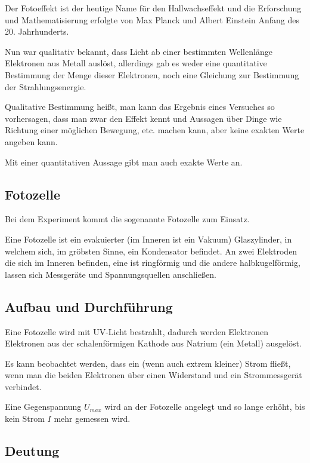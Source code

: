 Der Fotoeffekt ist der heutige Name für den Hallwachseffekt und die Erforschung und Mathematisierung erfolgte von Max Planck und Albert Einstein Anfang des 20. Jahrhunderts.

Nun war qualitativ bekannt, dass Licht ab einer bestimmten Wellenlänge Elektronen aus Metall auslöst, allerdings gab es weder eine quantitative Bestimmung der Menge dieser Elektronen, noch eine Gleichung zur Bestimmung der Strahlungsenergie.

\begin{NiceToKnow}
	Qualitative Bestimmung heißt, man kann das Ergebnis eines Versuches so vorhersagen, dass man zwar den Effekt kennt und Aussagen über Dinge wie Richtung einer möglichen Bewegung, etc. machen kann, aber keine exakten Werte angeben kann.
	
	Mit einer quantitativen Aussage gibt man auch exakte Werte an.
\end{NiceToKnow}


\subsection{Fotozelle}

Bei dem Experiment kommt die sogenannte Fotozelle zum Einsatz.

Eine Fotozelle ist ein evakuierter (im Inneren ist ein Vakuum) Glaszylinder, in welchem sich, im gröbsten Sinne, ein Kondensator befindet. An zwei Elektroden die sich im Inneren befinden, eine ist ringförmig und die andere halbkugelförmig, lassen sich Messgeräte und Spannungsquellen anschließen.

\subsection{Aufbau und Durchführung}

Eine Fotozelle wird mit UV-Licht bestrahlt, dadurch werden Elektronen Elektronen aus der schalenförmigen Kathode aus Natrium (ein Metall) ausgelöst. 

Es kann beobachtet werden, dass ein (wenn auch extrem kleiner) Strom fließt, wenn man die beiden Elektronen über einen Widerstand und ein Strommessgerät verbindet.

Eine Gegenspannung $U_{max}$ wird an der Fotozelle angelegt und so lange erhöht, bis kein Strom $I$ mehr gemessen wird.


\subsection{Deutung}

